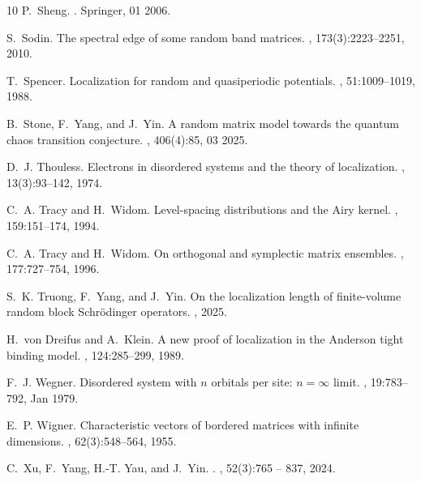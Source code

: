 \documentclass[10pt,reqno]{amsart}
\numberwithin{equation}{section}
\numberwithin{figure}{section}
\theoremstyle{plain} %
\theoremstyle{definition} %
\numberwithin{equation}{section}
\begin{document}
\begin{thebibliography}{10}
	P.~Sheng.
	.
	\newblock Springer, 01 2006.
	
	S.~Sodin.
	\newblock The spectral edge of some random band matrices.
	, 173(3):2223--2251, 2010.
	
	T.~Spencer.
	\newblock Localization for random and quasiperiodic potentials.
	, 51:1009--1019, 1988.
	
	B.~Stone, F.~Yang, and J.~Yin.
	\newblock A random matrix model towards the quantum chaos transition
	conjecture.
	, 406(4):85, 03 2025.
	
	D.~J. Thouless.
	\newblock Electrons in disordered systems and the theory of localization.
	, 13(3):93--142, 1974.
	
	C.~A. Tracy and H.~Widom.
	\newblock Level-spacing distributions and the {Airy} kernel.
	, 159:151--174, 1994.
	
	C.~A. Tracy and H.~Widom.
	\newblock On orthogonal and symplectic matrix ensembles.
	, 177:727--754, 1996.
	
	S.~K. Truong, F.~Yang, and J.~Yin.
	\newblock On the localization length of finite-volume random block
	{S}chr\"odinger operators.
	, 2025.
	
	H.~von Dreifus and A.~Klein.
	\newblock A new proof of localization in the {Anderson} tight binding model.
	, 124:285--299, 1989.
	
	F.~J. Wegner.
	\newblock Disordered system with $n$ orbitals per site: $n=\ensuremath{\infty}$
	limit.
	, 19:783--792, Jan 1979.
	
	E.~P. Wigner.
	\newblock Characteristic vectors of bordered matrices with infinite dimensions.
	, 62(3):548--564, 1955.
	
	C.~Xu, F.~Yang, H.-T. Yau, and J.~Yin.
	.
	, 52(3):765 -- 837, 2024.
	

\end{thebibliography}
\end{document}
